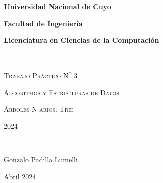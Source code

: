 {\centering
    {\bfseries\Large Universidad Nacional de Cuyo \par}
    \vspace{-0.2cm}
    {\bfseries\Large Facultad de Ingeniería \par}
    \vspace{-0.2cm}
    {\bfseries\Large Licenciatura en Ciencias de la Computación \par}
    \pagestyle{plain}
    \vfill
    \noindent\hrulefill \\
    {\scshape\Huge Trabajo Práctico N\textsuperscript{\Large\underline o} 3\par} %
    \vspace{0.5cm}
    {\scshape\Large Algoritmos y Estructuras de Datos \par}
    {\scshape\large Árboles N-arios: Trie \par}
    \vspace{0.5cm}
    {\scshape\Large 2024 \par} %
    \noindent\hrulefill \\
    \vspace{4cm}
    {\Large Gonzalo Padilla Lumelli \par}
    {\large Abril 2024 \par} %
    \vfill
    \setcounter{page}{1}
    \newpage
}